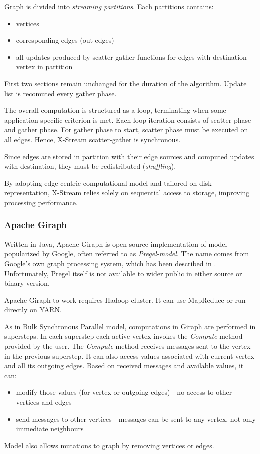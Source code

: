 Graph is divided into \textit{streaming partitions}. Each partitions contains:
\begin{itemize}
    \item vertices
    \item corresponding edges (out-edges)
    \item all updates produced by scatter-gather functions for edges with destination vertex in partition
\end{itemize}
First two sections remain unchanged for the duration of the algorithm. Update list is recomuted every gather phase.

The overall computation is structured as a loop, terminating when some application-specific criterion is met. Each loop iteration consists of scatter phase and gather phase. For gather phase to start, scatter phase must be executed on all edges. Hence, X-Stream scatter-gather is synchronous. %

Since edges are stored in partition with their edge sources and computed updates with destination, they must be redistributed (\textit{shuffling}).

By adopting edge-centric computational model and tailored on-disk representation, X-Stream relies solely on sequential access to storage, improving processing performance.

\subsubsection{Apache Giraph}
Written in Java, Apache Giraph is open-source implementation of model popularized by Google, often referred to as \textit{Pregel-model}. The name comes from Google's own graph processing system, which has been described in \cite{google-pregel}. Unfortunately, Pregel itself is not available to wider public in either source or binary version.

\noindent
Apache Giraph to work requires Hadoop cluster. It can use MapReduce or run directly on YARN.

\noindent
As in Bulk Synchronous Parallel model, computations in Giraph are performed in supersteps. In each superstep each active vertex invokes the \textit{Compute} method provided by the user. The \textit{Compute} method receives messages sent to the vertex in the previous superstep. It can also access values associated with current vertex and all its outgoing edges. Based on received messages and available values, it can:
\begin{itemize}
    \item modify those values (for vertex or outgoing edges) - no access to other vertices and edges
    \item send messages to other vertices - messages can be sent to any vertex, not only immediate neighbours
\end{itemize}
Model also allows mutations to graph by removing vertices or edges.


